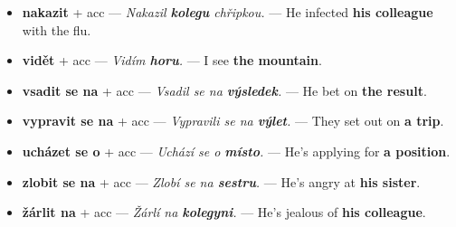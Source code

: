 \documentclass[12pt]{book}
\begin{document}
\begin{itemize}
    \item \textbf{nakazit} + acc --- \textit{Nakazil \textbf{kolegu} chřipkou.} --- He infected \textbf{his colleague} with the flu.
    \item \textbf{vidět} + acc --- \textit{Vidím \textbf{horu}.} --- I see \textbf{the mountain}.
    \item \textbf{vsadit se na} + acc --- \textit{Vsadil se na \textbf{výsledek}.} --- He bet on \textbf{the result}.
    \item \textbf{vypravit se na} + acc --- \textit{Vypravili se na \textbf{výlet}.} --- They set out on \textbf{a trip}.
    \item \textbf{ucházet se o} + acc --- \textit{Uchází se o \textbf{místo}.} --- He's applying for \textbf{a position}.
    \item \textbf{zlobit se na} + acc --- \textit{Zlobí se na \textbf{sestru}.} --- He's angry at \textbf{his sister}.
    \item \textbf{žárlit na} + acc --- \textit{Žárlí na \textbf{kolegyni}.} --- He's jealous of \textbf{his colleague}.
\end{itemize}
\end{document}
